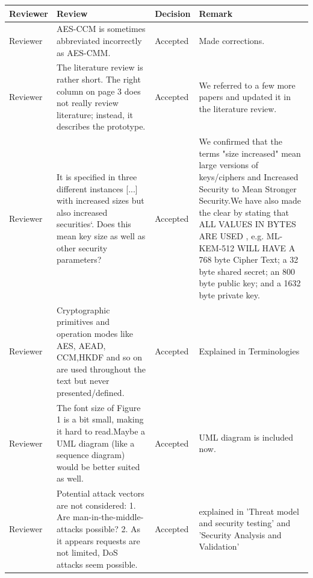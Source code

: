 \documentclass[a4paper]{scrartcl}
\begin{document}
    \begin{table}[H]
\centering
\begin{tabular}{|p{2cm}|p{5cm}|p{2cm}|p{5cm}|}
\hline
\textbf{Reviewer} & \textbf{Review} & \textbf{Decision} & \textbf{Remark} \\
\hline

Reviewer &
AES-CCM is sometimes abbreviated incorrectly as AES-CMM. &
Accepted &
Made corrections.\\
\hline

Reviewer &
The literature review is rather short. The right column on page 3 does not really review literature; instead, it describes the prototype.&
Accepted &
We referred to a few more papers and updated it in the literature review.\\
\hline

Reviewer &
It is specified in three different instances [...] with increased sizes but also increased securities‘. Does this mean key size as well as other
security parameters?&
Accepted &
We confirmed that the terms "size increased" mean large versions of keys/ciphers and Increased Security to Mean Stronger Security.We have also made the clear by stating that ALL VALUES IN BYTES ARE USED , e.g. ML-KEM-512 WILL HAVE A 768 byte Cipher Text; a 32 byte shared secret; an 800 byte public key; and a 1632 byte private key.\\
\hline

Reviewer  &
Cryptographic primitives and operation modes like AES, AEAD, CCM,HKDF and so on are used throughout the text but never
presented/defined.&
Accepted &
Explained in Terminologies\\
\hline

Reviewer &
The font size of Figure 1 is a bit small, making it hard to read.Maybe a UML diagram (like a sequence diagram) would be better suited as well. &
Accepted &
UML diagram is included now. \\
\hline

Reviewer &
Potential attack vectors are not considered: 1. Are
man-in-the-middle-attacks possible? 2. As it appears requests are not limited, DoS attacks seem possible. &
Accepted &
explained in 'Threat model and security testing' and 'Security Analysis and Validation'\\
\hline


\end{tabular}
\label{tab:review}
\end{table}
\end{document}
